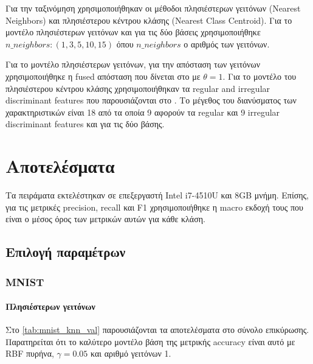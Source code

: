 \documentclass[a4paper]{article}
\begin{document}
Για την ταξινόμηση χρησιμοποιήθηκαν οι μέθοδοι πλησιέστερων γειτόνων (Nearest
Neighbors) και πλησιέστερου κέντρου κλάσης (Nearest Class Centroid). Για το
μοντέλο πλησιέστερων γειτόνων και για τις δύο βάσεις χρησιμοποιήθηκε
$n\_neighbors: (1, 3, 5, 10, 15)$ όπου $n\_neighbors$ ο αριθμός των γειτόνων.

Για το μοντέλο πλησιέστερων γειτόνων, για την απόσταση των γειτόνων
χρησιμοποιήθηκε η fused απόσταση που δίνεται στο \cite{kpca_lda} με $\theta =1$.
Για το μοντέλο του πλησιέστερου κέντρου κλάσης χρησιμοποιήθηκαν τα regular and
irregular discriminant features που παρουσιάζονται στο \cite{kpca_lda}. Το
μέγεθος του διανύσματος των χαρακτηριστικών είναι 18 από τα οποία 9 αφορούν τα
regular και 9 irregular discriminant features και για τις δύο βάσης.


\section{Αποτελέσματα}

Τα πειράματα εκτελέστηκαν σε επεξεργαστή Intel i7-4510U και 8GB μνήμη. Επίσης,
για τις μετρικές precision, recall και F1 χρησιμοποιήθηκε η macro εκδοχή τους
που είναι ο μέσος όρος των μετρικών αυτών για κάθε κλάση.

\subsection{Επιλογή παραμέτρων}

\subsubsection{MNIST}

\paragraph{Πλησιέστερων γειτόνων}

Στο \autoref{tab:mnist_knn_val} παρουσιάζονται τα αποτελέσματα στο σύνολο
επικύρωσης. Παρατηρείται ότι το καλύτερο μοντέλο βάση της μετρικής accuracy
είναι αυτό με RBF πυρήνα, $\gamma = 0.05$ και αριθμό γειτόνων 1.
\end{document}
